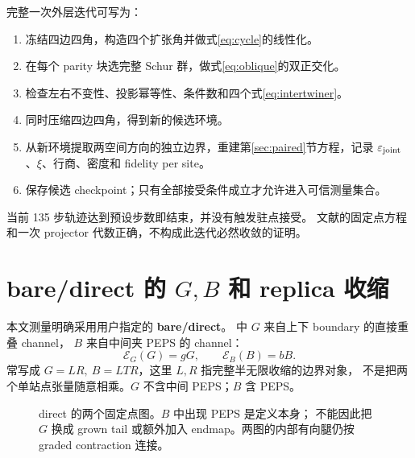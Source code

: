 \documentclass[11pt]{article}
\newcommand{\eps}{\varepsilon}
\newcommand{\fp}{\operatorname{FP}}
\begin{document}
完整一次外层迭代可写为：
\begin{enumerate}
 \item 冻结四边四角，构造四个扩张角并做式\eqref{eq:cycle}的线性化。
 \item 在每个 parity 块选完整 Schur 群，做式\eqref{eq:oblique}的双正交化。
 \item 检查左右不变性、投影幂等性、条件数和四个式\eqref{eq:intertwiner}。
 \item 同时压缩四边四角，得到新的候选环境。
 \item 从新环境提取两空间方向的独立边界，重建第\ref{sec:paired}节方程，记录
 $\eps_{\rm joint}$、$\xi$、行商、密度和 fidelity per site。
 \item 保存候选 checkpoint；只有全部接受条件成立才允许进入可信测量集合。
\end{enumerate}
当前 135 步轨迹达到预设步数即结束，并没有触发驻点接受。
文献的固定点方程和一次 projector 代数正确，不构成此迭代必然收敛的证明。

\section{bare/direct 的 \texorpdfstring{$G,B$}{G,B} 和 replica 收缩}
\label{sec:bare}
本文测量明确采用用户指定的 \textbf{bare/direct}。
 中 $G$ 来自上下 boundary 的直接重叠 channel，
$B$ 来自中间夹 PEPS 的 channel：
\begin{equation}
 \mathcal E_G(G)=gG,\qquad \mathcal E_B(B)=bB.
\end{equation}
常写成 $G=LR,\ B=LTR$，这里 $L,R$ 指完整半无限收缩的边界对象，
不是把两个单站点张量随意相乘。$G$ 不含中间 PEPS；$B$ 含 PEPS。

\begin{figure}[htbp]\centering
{}
\caption{direct 的两个固定点图。$B$ 中出现 PEPS 是定义本身；
不能因此把 $G$ 换成 grown tail 或额外加入 endmap。两图的内部有向腿仍按 graded contraction 连接。}
\end{figure}
\end{document}

